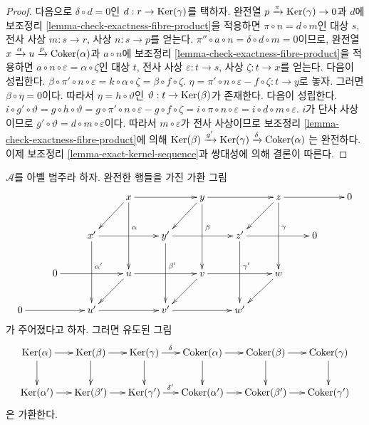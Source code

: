 \begin{proof}
\medskip\noindent
다음으로 $\delta \circ d = 0$인 $d : r \to \mathop{\mathrm{Ker}}(\gamma)$를 택하자.
완전열 $p \xrightarrow{\pi} \mathop{\mathrm{Ker}}(\gamma) \to 0$과 $d$에 보조정리
\ref{lemma-check-exactness-fibre-product}을 적용하면
$\pi \circ n = d \circ m$인 대상 $s$, 전사 사상 $m : s \to r$,
사상 $n : s \to p$를 얻는다.
$\pi'' \circ a \circ n = \delta \circ d \circ m = 0$이므로,
완전열 $x \xrightarrow{\alpha} u \xrightarrow{p} \mathop{\mathrm{Coker}}(\alpha)$과
$a \circ n$에 보조정리 \ref{lemma-check-exactness-fibre-product}을 적용하면
$a \circ n \circ \varepsilon = \alpha \circ \zeta$인 대상 $t$,
전사 사상 $\varepsilon : t \to s$, 사상 $\zeta : t \to x$를 얻는다.
다음이 성립한다.
$\beta \circ \pi' \circ n \circ \varepsilon =
k \circ \alpha \circ \zeta = \beta \circ f \circ \zeta$.
$\eta = \pi' \circ n \circ \varepsilon - f \circ \zeta : t \to y$로 놓자.
그러면 $\beta \circ \eta = 0$이다. 따라서
$\eta = h \circ \vartheta$인 $\vartheta : t \to \mathop{\mathrm{Ker}}(\beta)$가 존재한다.
다음이 성립한다.
$i \circ g' \circ \vartheta = g \circ h \circ \vartheta =
g \circ \pi' \circ n \circ \varepsilon - g \circ f \circ \zeta =
i \circ \pi \circ n \circ \varepsilon = i \circ d \circ m \circ \varepsilon$.
$i$가 단사 사상이므로
$g' \circ \vartheta = d \circ m \circ \varepsilon$이다.
따라서 $m \circ \varepsilon$가 전사 사상이므로 보조정리
\ref{lemma-check-exactness-fibre-product}에 의해
$\mathop{\mathrm{Ker}}(\beta) \xrightarrow{g'} \mathop{\mathrm{Ker}}(\gamma) \xrightarrow{\delta} \mathop{\mathrm{Coker}}(\alpha)$
는 완전하다. 이제 보조정리 \ref{lemma-exact-kernel-sequence}과 쌍대성에 의해
결론이 따른다.
\end{proof}

\begin{lemma}
\label{lemma-snake-natural}
$\mathcal{A}$를 아벨 범주라 하자. 완전한 행들을 가진 가환 그림
$$
\xymatrix{
& & & x\ar[ld]\ar[rr]\ar[dd]^(.4)\alpha
& & y\ar[ld]\ar[rr]\ar[dd]^(.4)\beta
& & z\ar[ld]\ar[rr]\ar[dd]^(.4)\gamma
& & 0\\
& & x'\ar[rr]\ar[dd]^(.4){\alpha'}
& & y'\ar[rr]\ar[dd]^(.4){\beta'}
& & z'\ar[rr]\ar[dd]^(.4){\gamma'}
& & 0
& \\
& 0\ar[rr]
& & u\ar[ld]\ar[rr]
& & v\ar[ld]\ar[rr]
& & w\ar[ld]
& & \\
0\ar[rr]
& & u'\ar[rr]
& & v'\ar[rr]
& & w'
& & &
}
$$
가 주어졌다고 하자. 그러면 유도된 그림
$$
\xymatrix@C=15pt{
\Ker(\alpha) \ar[r] \ar[d] &
\Ker(\beta) \ar[r] \ar[d] &
\Ker(\gamma) \ar[r]^(.45){\delta} \ar[d] &
\Coker(\alpha) \ar[r] \ar[d] &
\Coker(\beta) \ar[r] \ar[d] &
\Coker(\gamma) \ar[d] \\
\Ker(\alpha') \ar[r] &
\Ker(\beta') \ar[r] &
\Ker(\gamma') \ar[r]^(.45){\delta'} &
\Coker(\alpha') \ar[r] &
\Coker(\beta') \ar[r] &
\Coker(\gamma')
}
$$
은 가환한다.
\end{lemma}

